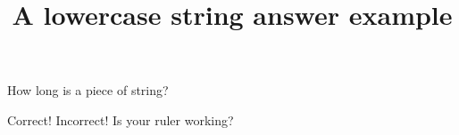 \documentclass[hidesidemenu]{webquiz}
\title{A lowercase string answer example}
\begin{document}
  \begin{question}     %
     How long is a piece of string?

     \whenRight Correct!
     \whenWrong Incorrect! Is your ruler working?
  \end{question}
\end{document}
